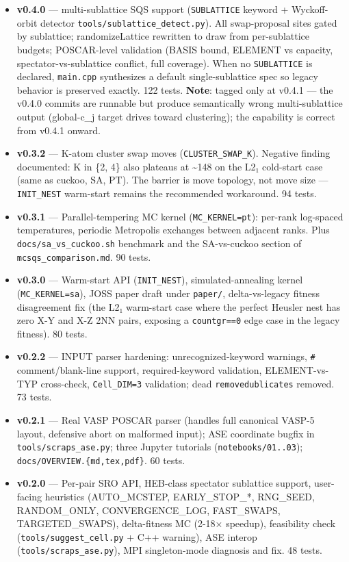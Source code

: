 \documentclass[
  11pt,
]{article}
\begin{document}
\begin{itemize}
\item
  \textbf{v0.4.0} --- multi-sublattice SQS support (\texttt{SUBLATTICE}
  keyword + Wyckoff-orbit detector
  \texttt{tools/sublattice\_detect.py}). All swap-proposal sites gated
  by sublattice; randomizeLattice rewritten to draw from per-sublattice
  budgets; POSCAR-level validation (BASIS bound, ELEMENT vs capacity,
  spectator-vs-sublattice conflict, full coverage). When no
  \texttt{SUBLATTICE} is declared, \texttt{main.cpp} synthesizes a
  default single-sublattice spec so legacy behavior is preserved
  exactly. 122 tests. \textbf{Note}: tagged only at v0.4.1 --- the
  v0.4.0 commits are runnable but produce semantically wrong
  multi-sublattice output (global-c\_j target drives toward clustering);
  the capability is correct from v0.4.1 onward.
\item
  \textbf{v0.3.2} --- K-atom cluster swap moves
  (\texttt{CLUSTER\_SWAP\_K}). Negative finding documented: K in \{2,
  4\} also plateaus at \textasciitilde148 on the L2₁ cold-start case
  (same as cuckoo, SA, PT). The barrier is move topology, not move size
  --- \texttt{INIT\_NEST} warm-start remains the recommended workaround.
  94 tests.
\item
  \textbf{v0.3.1} --- Parallel-tempering MC kernel
  (\texttt{MC\_KERNEL=pt}): per-rank log-spaced temperatures, periodic
  Metropolis exchanges between adjacent ranks. Plus
  \texttt{docs/sa\_vs\_cuckoo.sh} benchmark and the SA-vs-cuckoo section
  of \texttt{mcsqs\_comparison.md}. 90 tests.
\item
  \textbf{v0.3.0} --- Warm-start API (\texttt{INIT\_NEST}),
  simulated-annealing kernel (\texttt{MC\_KERNEL=sa}), JOSS paper draft
  under \texttt{paper/}, delta-vs-legacy fitness disagreement fix (the
  L2₁ warm-start case where the perfect Heusler nest has zero X-Y and
  X-Z 2NN pairs, exposing a \texttt{countgr==0} edge case in the legacy
  fitness). 80 tests.
\item
  \textbf{v0.2.2} --- INPUT parser hardening: unrecognized-keyword
  warnings, \texttt{\#} comment/blank-line support, required-keyword
  validation, ELEMENT-vs-TYP cross-check, \texttt{Cell\_DIM=3}
  validation; dead \texttt{removedublicates} removed. 73 tests.
\item
  \textbf{v0.2.1} --- Real VASP POSCAR parser (handles full canonical
  VASP-5 layout, defensive abort on malformed input); ASE coordinate
  bugfix in \texttt{tools/scraps\_ase.py}; three Jupyter tutorials
  (\texttt{notebooks/01..03}); \texttt{docs/OVERVIEW.\{md,tex,pdf\}}. 60
  tests.
\item
  \textbf{v0.2.0} --- Per-pair SRO API, HEB-class spectator sublattice
  support, user-facing heuristics (AUTO\_MCSTEP, EARLY\_STOP\_*,
  RNG\_SEED, RANDOM\_ONLY, CONVERGENCE\_LOG, FAST\_SWAPS,
  TARGETED\_SWAPS), delta-fitness MC (2-18× speedup), feasibility check
  (\texttt{tools/suggest\_cell.py} + C++ warning), ASE interop
  (\texttt{tools/scraps\_ase.py}), MPI singleton-mode diagnosis and fix.
  48 tests.
\end{itemize}
\end{document}
